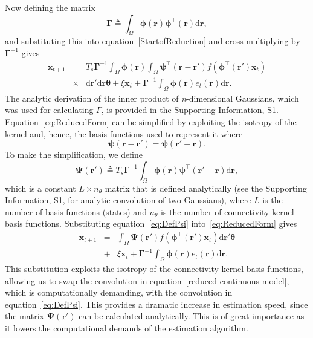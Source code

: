 \documentclass[12pt]{iopart}
\begin{document}
Now defining the matrix
\begin{equation}\label{eq:DefGamma}
	\boldsymbol{\Gamma} \triangleq \int_\Omega {\boldsymbol{\phi} \left(\mathbf{r}\right)\boldsymbol{\phi} ^{\top}\left(\mathbf{r}\right)\textrm{d}\mathbf{r}}, 
\end{equation}
and substituting this into equation~\ref{StartofReduction} and cross-multiplying by $\boldsymbol{\Gamma}^{-1}$ gives 
\begin{eqnarray}
    \label{eq:ReducedForm}
	 \mathbf{x}_{t+1} &=& T_s\boldsymbol{\Gamma}^{-1}
	 \int_\Omega \boldsymbol{\phi}(\mathbf{r}) 
	 \int_\Omega \boldsymbol{\psi}^{\top} (\mathbf{r}-\mathbf{r}')f(\boldsymbol{\phi}^{\top}(\mathbf{r}')\mathbf{x}_t) \nonumber \\
	&\times& \textrm{d}\mathbf{r}' \textrm{d}\mathbf{r} \boldsymbol{\theta}  
	 + \xi\mathbf{x}_t + \boldsymbol{\Gamma}^{-1} \int_\Omega{\boldsymbol{\phi}(\mathbf{r}) e_t(\mathbf{r})\textrm{d}\mathbf{r}}.
\end{eqnarray}
The analytic derivation of the inner product of \emph{n}-dimensional Gaussians, which was used for calculating $\Gamma$, is provided in the Supporting Information, S1. Equation~\ref{eq:ReducedForm} can be simplified by exploiting the isotropy of the kernel and, hence, the basis functions used to represent it where
\begin{equation}
	\boldsymbol{\psi} (\mathbf{r}-\mathbf{r}') = \boldsymbol{\psi} (\mathbf{r}'-\mathbf{r}).
\end{equation}
To make the simplification, we define
\begin{equation}\label{eq:DefPsi}
	\boldsymbol{\Psi}(\mathbf{r}') \triangleq T_s\boldsymbol{\Gamma}^{-1}\int_\Omega {\boldsymbol{\phi}(\mathbf{r})\boldsymbol{\psi}^{\top} (\mathbf{r}'-\mathbf{r})\textrm{d}\mathbf{r}},
\end{equation}
which is a constant $L \times n_{\theta}$ matrix that is defined analytically (see the Supporting Information, S1, for analytic convolution of two Gaussians), where $L$ is the number of basis functions (states) and $n_{\theta}$ is the number of connectivity kernel basis functions. Substituting equation~\ref{eq:DefPsi} into~\ref{eq:ReducedForm} gives
\begin{eqnarray}
	\mathbf{x}_{t+1} &=& \int_\Omega \boldsymbol{\Psi}(\mathbf{r}') f(\boldsymbol{\phi}^{\top}(\mathbf{r}')\mathbf{x}_t) \textrm{d}\mathbf{r}' \boldsymbol{\theta} \nonumber \\ &+& \xi\mathbf{x}_t 
+ \boldsymbol{\Gamma}^{-1} \int_\Omega{\boldsymbol{\phi}(\mathbf{r})e_t(\mathbf{r})\textrm{d}\mathbf{r}}.
\end{eqnarray}
This substitution exploits the isotropy of the connectivity kernel basis functions, allowing us to swap the convolution in equation~\ref{reduced continuous model}, which is computationally demanding, with the convolution in equation~\ref{eq:DefPsi}. This provides a dramatic increase in estimation speed, since the matrix $\boldsymbol\Psi(\mathbf{r}')$ can be calculated analytically. This is of great importance as it lowers the computational demands of the estimation algorithm. 
\end{document}

